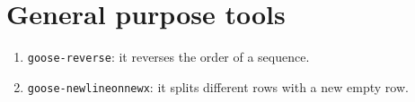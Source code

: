 \chapter{General purpose tools}
\label{seq}

\begin{enumerate}
\item \texttt{goose-reverse}: it reverses the order of a sequence.
\item \texttt{goose-newlineonnewx}: it splits different rows with a new empty row.
\end{enumerate}

%
%
%
%
%
%
%
%
%

%
%
%
%
